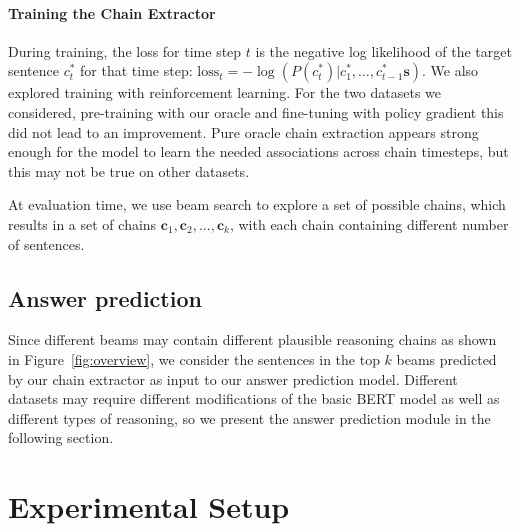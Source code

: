 \documentclass[11pt,a4paper]{article}
\begin{document}
\paragraph{Training the Chain Extractor} During training, the loss for time step $t$ is the negative log likelihood of the target sentence $c^*_t$ for that time step: $\textrm{loss}_t = -\log(P(c_t^*)|c_1^*,\ldots,c_{t-1}^*\mathbf{s})$. We also explored training with reinforcement learning. For the two datasets we considered, pre-training with our oracle and fine-tuning with policy gradient this did not lead to an improvement. Pure oracle chain extraction appears strong enough for the model to learn the needed associations across chain timesteps, but this may not be true on other datasets.

At evaluation time, we use beam search to explore a set of possible chains, which results in a set of chains $\mathbf{c}_1, \mathbf{c}_2, ... , \mathbf{c}_k$, with each chain containing different number of sentences.



\subsection{Answer prediction}
Since different beams may contain different plausible reasoning chains as shown in Figure~\ref{fig:overview}, we consider the sentences in the top $k$ beams predicted by our chain extractor as input to our answer prediction model. Different datasets may require different modifications of the basic BERT model as well as different types of reasoning, so we present the answer prediction module in the following section.

\section{Experimental Setup}\label{sec:exp}
\end{document}
